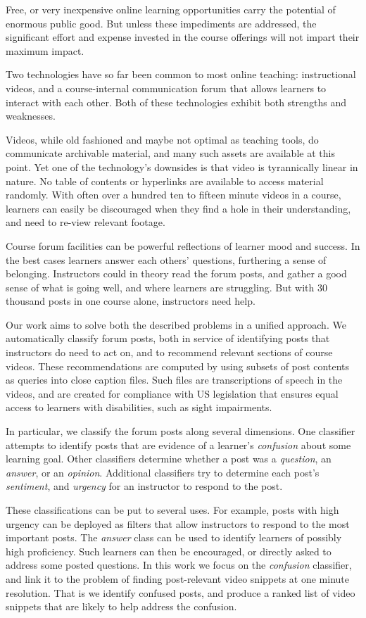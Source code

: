 \documentclass{edm_template}
\begin{document}
Free, or very inexpensive online learning opportunities carry the
potential of enormous public good. But unless these impediments are
addressed, the significant effort and expense invested in the course
offerings will not impart their maximum impact.

Two technologies have so far been common to most online teaching:
instructional videos, and a course-internal communication forum that
allows learners to interact with each other. Both of these
technologies exhibit both strengths and weaknesses.

Videos, while old fashioned and maybe not optimal as teaching tools,
do communicate archivable material, and many such assets are available
at this point. Yet one of the technology's downsides is that video is
tyrannically linear in nature. No table of contents or hyperlinks are
available to access material randomly. With often over a hundred ten
to fifteen minute videos in a course, learners can easily be
discouraged when they find a hole in their understanding, and need to
re-view relevant footage.

Course forum facilities can be powerful reflections of learner mood
and success. In the best cases learners answer each others' questions,
furthering a sense of belonging. Instructors could in theory read the
forum posts, and gather a good sense of what is going well, and where
learners are struggling. But with 30 thousand posts in one course
alone, instructors need help.

Our work aims to solve both the described problems in a unified
approach. We automatically classify forum posts, both in service of
identifying posts that instructors do need to act on, and to recommend
relevant sections of course videos. These recommendations are computed
by using subsets of post contents as queries into close caption
files. Such files are transcriptions of speech in the videos, and are
created for compliance with US legislation that ensures equal access
to learners with disabilities, such as sight impairments.

In particular, we classify the forum posts along several
dimensions. One classifier attempts to identify posts that are
evidence of a learner's {\em confusion} about some learning
goal. Other classifiers determine whether a post was a {\em question},
an {\em answer}, or an {\em opinion}. Additional classifiers try to
determine each post's {\em sentiment}, and {\em urgency} for an
instructor to respond to the post.

These classifications can be put to several uses. For example, posts
with high urgency can be deployed as filters that allow instructors to
respond to the most important posts. The {\em answer} class can be
used to identify learners of possibly high proficiency. Such learners
can then be encouraged, or directly asked to address some posted
questions. In this work we focus on the {\em confusion} classifier,
and link it to the problem of finding post-relevant video snippets at
one minute resolution. That is we identify confused posts, and produce
a ranked list of video snippets that are likely to help address the
confusion.
\end{document}
